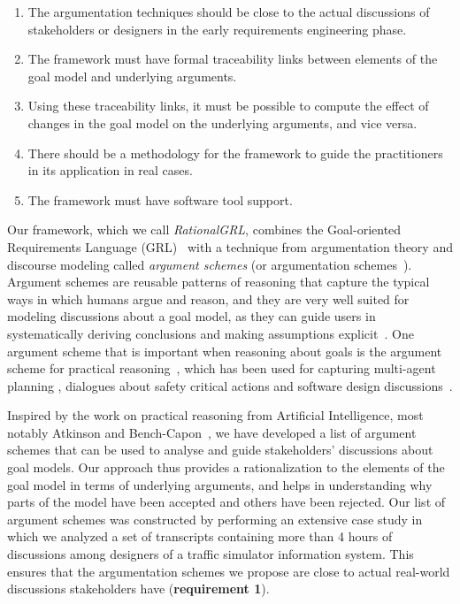 \begin{enumerate}
\item 
The argumentation techniques should be close to the actual discussions of stakeholders or designers in the early requirements engineering phase.
\item 
The framework must have formal traceability links between elements of the goal model and underlying arguments.
\item 
Using these traceability links, it must be possible to compute the effect of changes in the goal model on the underlying arguments, and vice versa.
\item 
There should be a methodology for the framework to guide the practitioners in its application in real cases.
\item 
The framework must have software tool support.
\end{enumerate}

Our framework, which we call \emph{RationalGRL}, combines the Goal-oriented Requirements Language (GRL)~\cite{Amyot:2010:EGM:1841349.1841356} with a technique from argumentation theory and discourse modeling called \emph{argument schemes} (or argumentation schemes~\cite{walton-etal2008}). Argument schemes are reusable patterns of reasoning that capture the typical ways in which humans argue and reason, and they are very well suited for modeling discussions about a goal model, as they can guide users in systematically deriving conclusions and making assumptions explicit~\cite{murukannaiah2015}. One argument scheme that is important when reasoning about goals is the argument scheme for practical reasoning~\cite{walton1990,atkinson2007}, which has been used for capturing multi-agent planning \cite{medellin2013planning}, dialogues about safety critical actions \cite{tolchinsky2012deliberation} and software design discussions~\cite{BlackEtal2013}. 

Inspired by the work on practical reasoning from Artificial Intelligence, most notably Atkinson and Bench-Capon~\cite{atkinson2007}, we have developed a list of argument schemes that can be used to analyse and guide stakeholders' discussions about goal models. Our approach thus provides a rationalization to the elements of the goal model in terms of underlying arguments, and helps in understanding why parts of the model have been accepted and others have been rejected. Our list of argument schemes was constructed by performing an extensive case study in which we analyzed a set of transcripts containing more than 4 hours of discussions among designers of a traffic simulator information system. This ensures that the argumentation schemes we propose are close to actual real-world discussions stakeholders have (\textbf{requirement 1}).  

